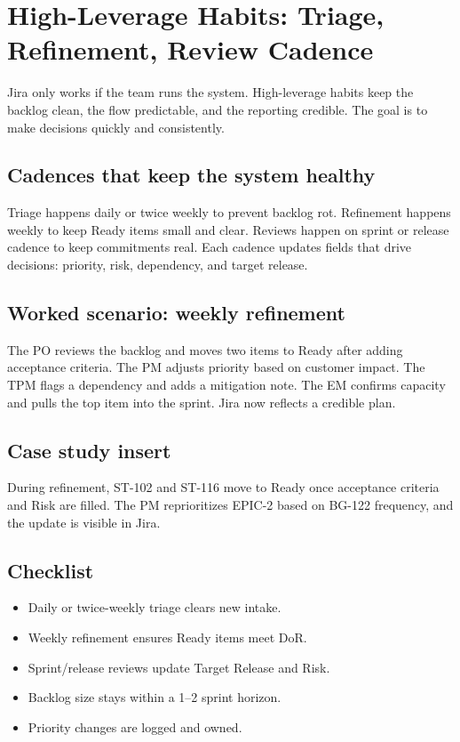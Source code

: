 \section{High-Leverage Habits: Triage, Refinement, Review Cadence}
Jira only works if the team runs the system. High-leverage habits keep the backlog clean, the flow predictable, and the reporting credible. The goal is to make decisions quickly and consistently.

\subsection{Cadences that keep the system healthy}
Triage happens daily or twice weekly to prevent backlog rot. Refinement happens weekly to keep Ready items small and clear. Reviews happen on sprint or release cadence to keep commitments real. Each cadence updates fields that drive decisions: priority, risk, dependency, and target release.

\subsection{Worked scenario: weekly refinement}
The PO reviews the backlog and moves two items to Ready after adding acceptance criteria. The PM adjusts priority based on customer impact. The TPM flags a dependency and adds a mitigation note. The EM confirms capacity and pulls the top item into the sprint. Jira now reflects a credible plan.

\subsection{Case study insert}
During refinement, ST-102 and ST-116 move to Ready once acceptance criteria and Risk are filled. The PM reprioritizes EPIC-2 based on BG-122 frequency, and the update is visible in Jira.
\subsection{Checklist}
\begin{itemize}
  \item Daily or twice-weekly triage clears new intake.
  \item Weekly refinement ensures Ready items meet DoR.
  \item Sprint/release reviews update Target Release and Risk.
  \item Backlog size stays within a 1--2 sprint horizon.
  \item Priority changes are logged and owned.
\end{itemize}

